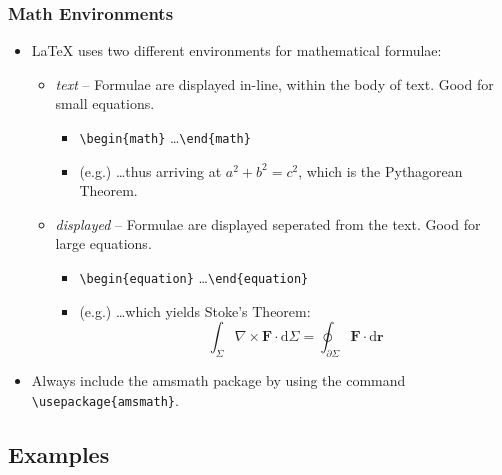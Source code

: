 \documentclass{beamer}
\begin{document}
\begin{frame}[containsverbatim]
    \frametitle{Math Environments}
    \begin{itemize}
        \item \LaTeX { uses} two different environments for mathematical formulae:
        \begin{itemize}
            \item \emph{text} -- Formulae are displayed in-line, within the body of text. Good for small equations.
            \begin{itemize}
                \item \verb|\begin{math}| \ldots \verb|\end{math}|
                \item (e.g.) \ldots thus arriving at \begin{math} a^2 + b^2 = c^2 \end{math}, which is the Pythagorean Theorem.
            \end{itemize}
            \item \emph{displayed} -- Formulae are displayed seperated from the text. Good for large equations.
            \begin{itemize}
            \item \verb|\begin{equation}| \ldots \verb|\end{equation}|
            \item (e.g.) \ldots which yields Stoke's Theorem: \begin{equation} \int_\Sigma \nabla \times \mathbf{F} \cdot \mathrm{d}\Sigma = \oint_{\partial\Sigma} \mathbf{F} \cdot \mathrm{d}\mathbf{r} \end{equation}
            \end{itemize}
        \end{itemize}
    \item Always include the amsmath package by using the command \verb|\usepackage{amsmath}|.
    \end{itemize}
\end{frame}

\subsection{Examples}
\end{document}
